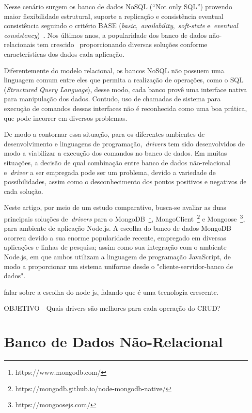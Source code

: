\documentclass[12pt]{article}
\begin{document}
Nesse cenário surgem os banco de dados NoSQL (``Not only SQL'') provendo maior flexibilidade estrutural, suporte a replicação e consistência eventual consistência seguindo o critério BASE (\textit{basic},~\textit{availability},~\textit{soft-state} e~\textit{eventual consistency})~\cite{han2011survey}. 
Nos últimos anos, a popularidade dos banco de dados não-relacionais tem crescido~\cite{cooper2010benchmarking,edlich2015nosql} proporcionando diversas soluções conforme características dos dados cada aplicação.

Diferentemente do modelo relacional, os bancos NoSQL não possuem uma linguagem comum entre eles que permita a realização de operações, como o SQL (\emph{Structured Query Language}), desse modo, cada banco provê uma interface nativa para manipulação dos dados. 
Contudo, uso de chamadas de sistema para execução de comandos dessas interfaces não é reconhecida como uma boa prática, que pode incorrer em diversos problemas. 

De modo a contornar essa situação, para os diferentes ambientes de desenvolvimento e linguagens de programação,~\emph{drivers} tem sido desenvolvidos de modo a viabilizar a execução dos comandos no banco de dados. 
Em muitas situações, a decisão de qual combinação entre banco de dados não-relacional e~\emph{driver} a ser empregada pode ser um problema, devido a variedade de possibilidades, assim como o desconhecimento dos pontos positivos e negativos de cada solução.

Neste artigo, por meio de um estudo comparativo, busca-se avaliar as duas principais soluções de~\emph{drivers} para o MongoDB~\footnote{https://www.mongodb.com/}, MongoClient~\footnote{https://mongodb.github.io/node-mongodb-native/} e Mongoose~\footnote{https://mongoosejs.com/}, para ambiente de aplicação Node.js. 
A escolha do banco de dados MongoDB ocorreu devido a sua enorme popularidade recente, empregado em diversas aplicações e linhas de pesquisa; assim como sua integração com o ambiente Node.js, em que ambos utilizam a linguagem de programação JavaScript, de modo a proporcionar um sistema uniforme desde o "cliente-servidor-banco de dados".

falar sobre a escolha do node js, falando que é uma tecnologia crescente.

OBJETIVO - Quais drivers são melhores para cada operação do CRUD?


\section{Banco de Dados Não-Relacional}
\end{document}
